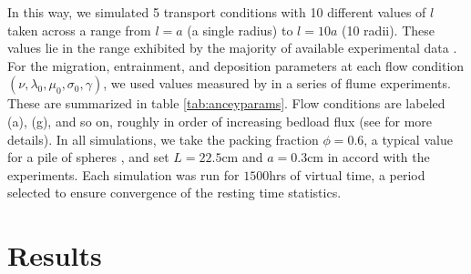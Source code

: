 \documentclass[draft]{agujournal2018}
\begin{document}

In this way, we simulated 5 transport conditions with 10 different values of $l$ taken across a range from $l=a$ (a single radius) to $l=10a$ (10 radii).
These values lie in the range exhibited by the majority of available experimental data \citep{Wong2007,Singh2009,Martin2014}.
For the migration, entrainment, and deposition parameters at each flow condition $(\nu, \lambda_0, \mu_0, \sigma_0, \gamma)$, we used values measured by \citet{Ancey2008} in a series of flume experiments.
These are summarized in table \ref{tab:anceyparams}.
Flow conditions are labeled (a), (g), and so on, roughly in order of increasing bedload flux (see \citet{Ancey2008} for more details). 
In all simulations, we take the packing fraction $\phi = 0.6$, a typical value for a pile of spheres \citep[e.g.][]{Bennett1972}, and set $L = 22.5$cm and $a = 0.3$cm in accord with the \citet{Ancey2008} experiments.
Each simulation was run for $1500$hrs of virtual time, a period selected to ensure convergence of the resting time statistics.

\section{Results}
\end{document}
